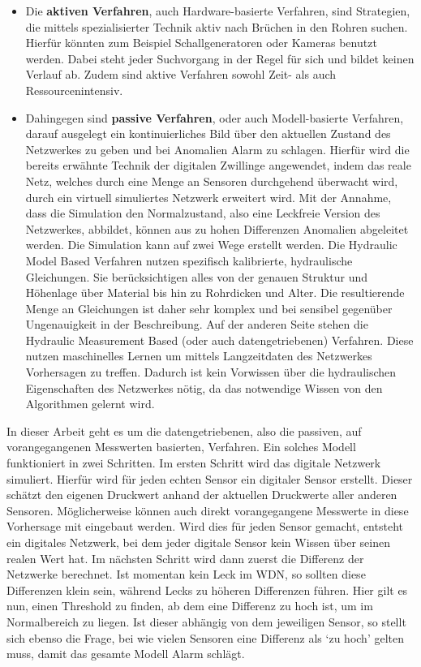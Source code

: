 \begin{itemize}
    
    \item Die \textbf{aktiven Verfahren}, auch Hardware-basierte Verfahren, sind Strategien, die mittels
     spezialisierter Technik aktiv nach Brüchen in den Rohren suchen. Hierfür könnten zum Beispiel
     Schallgeneratoren oder Kameras benutzt werden. Dabei steht jeder Suchvorgang in der Regel für sich
     und bildet keinen Verlauf ab. Zudem sind aktive Verfahren sowohl Zeit- als auch Ressourcenintensiv.

    \item Dahingegen sind \textbf{passive Verfahren}, oder auch Modell-basierte Verfahren, darauf ausgelegt
     ein kontinuierliches Bild über den aktuellen Zustand des Netzwerkes zu geben und bei Anomalien Alarm zu
     schlagen. Hierfür wird die bereits erwähnte Technik der digitalen Zwillinge angewendet, indem das reale
     Netz, welches durch eine Menge an Sensoren durchgehend überwacht wird, durch ein virtuell simuliertes
     Netzwerk erweitert wird. Mit der Annahme, dass die Simulation den Normalzustand, also eine Leckfreie
     Version des Netzwerkes, abbildet, können aus zu hohen Differenzen Anomalien abgeleitet werden. Die
     Simulation kann auf zwei Wege erstellt werden. Die Hydraulic Model Based Verfahren nutzen spezifisch
     kalibrierte, hydraulische Gleichungen. Sie berücksichtigen alles von der genauen Struktur und Höhenlage
     über Material bis hin zu Rohrdicken und Alter. Die resultierende Menge an Gleichungen ist daher sehr
     komplex und bei sensibel gegenüber Ungenauigkeit in der Beschreibung. Auf der anderen Seite stehen die
     Hydraulic Measurement Based (oder auch datengetriebenen) Verfahren. Diese nutzen maschinelles Lernen um
     mittels Langzeitdaten des Netzwerkes Vorhersagen zu treffen. Dadurch ist kein Vorwissen über die
     hydraulischen Eigenschaften des Netzwerkes nötig, da das notwendige Wissen von den Algorithmen gelernt wird.
    
\end{itemize}

In dieser Arbeit geht es um die datengetriebenen, also die passiven, auf vorangegangenen Messwerten
 basierten, Verfahren. Ein solches Modell funktioniert in zwei Schritten. Im ersten Schritt wird das
 digitale Netzwerk simuliert. Hierfür wird für jeden echten Sensor ein digitaler Sensor erstellt. Dieser
 schätzt den eigenen Druckwert anhand der aktuellen Druckwerte aller anderen Sensoren. Möglicherweise können
 auch direkt vorangegangene Messwerte in diese Vorhersage mit eingebaut werden. Wird dies für jeden Sensor
 gemacht, entsteht ein digitales Netzwerk, bei dem jeder digitale Sensor kein Wissen über seinen realen Wert
 hat. Im nächsten Schritt wird dann zuerst die Differenz der Netzwerke berechnet. Ist momentan kein Leck im
 WDN, so sollten diese Differenzen klein sein, während Lecks zu höheren Differenzen führen. Hier gilt es nun,
 einen Threshold zu finden, ab dem eine Differenz zu hoch ist, um im Normalbereich zu liegen. Ist dieser
 abhängig von dem jeweiligen Sensor, so stellt sich ebenso die Frage, bei wie vielen Sensoren eine Differenz
 als ‘zu hoch’ gelten muss, damit das gesamte Modell Alarm schlägt.

